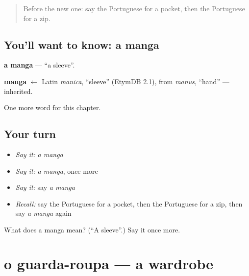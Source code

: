 \label{lesson:PT-C169-manga}



\begin{quote}
Before the new one: say the Portuguese for a pocket, then the Portuguese for a zip.
\end{quote}

\subsection*{You'll want to know: a manga}
\textbf{a manga} — \textquotedblleft{}a sleeve\textquotedblright{}.

\begin{cousinweb}
\textbf{manga} $\leftarrow$ Latin \emph{manica}, \textquotedblleft{}sleeve\textquotedblright{} (EtymDB 2.1), from \emph{manus}, \textquotedblleft{}hand\textquotedblright{} — inherited.
\end{cousinweb}

\begin{grammarlens}[title={What you've built}]
One more word for this chapter.
\end{grammarlens}

\subsection*{Your turn}
\begin{itemize}
\raggedright
  \item \emph{Say it:} \emph{a manga}
  \item \emph{Say it:} \emph{a manga}, once more
  \item \emph{Say it:} say \emph{a manga}
  \item \emph{Recall:} say the Portuguese for a pocket, then the Portuguese for a zip, then say \emph{a manga} again
\end{itemize}

\begin{tcolorbox}[breakable,colback=teal!4,colframe=teal!35!black,title={Before you move on}]
What does a manga mean? (\textquotedblleft{}A sleeve\textquotedblright{}.) Say it once more.
\end{tcolorbox}
\section[o guarda-roupa]{o guarda-roupa — a wardrobe}

\label{lesson:PT-C169-guarda-roupa}



